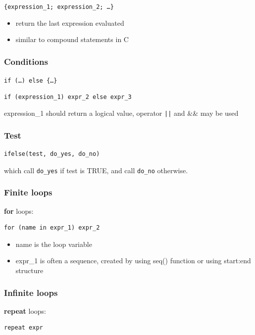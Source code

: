 \verb!{expression_1; expression_2; …}!  
\begin{itemize}
\item return the last expression evaluated
\item similar to compound statements in C
\end{itemize}

\subsubsection{Conditions}
\label{sec:conditions}

\verb!if (…) else {…}!
\begin{verbatim}
if (expression_1) expr_2 else expr_3
\end{verbatim}
expression\_1 should return a logical value, operator \verb!||! and
\&\& may be used

\subsubsection{Test}
\label{sec:test}


\begin{lstlisting}
ifelse(test, do_yes, do_no)
\end{lstlisting}
which call \verb|do_yes| if test is TRUE, and call \verb|do_no|
otherwise.

\subsubsection{Finite loops}
\label{sec:finite-loops}

{\bf for} loops: 
\begin{verbatim}
for (name in expr_1) expr_2
\end{verbatim}

\begin{itemize}
\item name is the loop variable
\item expr\_1 is often a sequence, created by using seq() function or
  using start:end structure
\end{itemize}

\subsubsection{Infinite loops}
\label{sec:infinite-loops}


{\bf repeat} loops: 
\begin{verbatim}
repeat expr
\end{verbatim}

